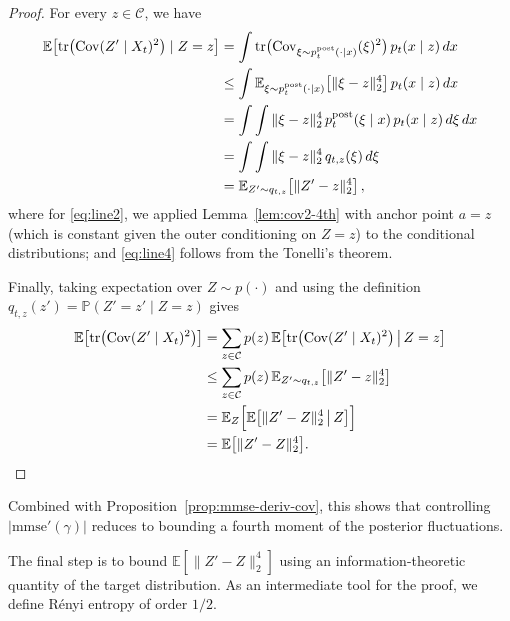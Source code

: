 \documentclass[11pt]{article}
\theoremstyle{definition}
\newcommand{\Cov}{\operatorname{Cov}}
\numberwithin{equation}{section}
\begin{document}
\begin{proof}

For every \(z \in \mathcal{C}\), we have
\begin{align}
\mathbb{E}\bigl[ \operatorname{tr}\bigl( \Cov(Z' \mid X_t)^2 \bigr) \mid Z = z \bigr]
&= \int \operatorname{tr}\bigl( \Cov_{\xi\sim p^{\mathrm{post}}_t(\cdot \mid x)}(\xi)^2 \bigr) \, p_t(x \mid z) \, dx \notag\\
&\le \int \mathbb{E}_{\xi\sim p^{\mathrm{post}}_t(\cdot \mid x)}\bigl[ \|\xi - z\|_2^4 \bigr] \,  p_t(x \mid z) \, dx \label{eq:line2}\\
&= \int \int \|\xi - z\|_2^4 \, p^{\mathrm{post}}_t(\xi \mid x)\, p_t(x \mid z) \, d\xi \, dx \notag\\
&= \int \int \|\xi - z\|_2^4 \, q_{t,z} (\xi) \, d\xi  \label{eq:line4}\\
&= \mathbb{E}_{Z' \sim q_{t,z}} \bigl[ \|Z' - z\|_2^4 \bigr]\notag\,,
\end{align}
where for \eqref{eq:line2}, we applied Lemma~\ref{lem:cov2-4th} with anchor point \(a = z\) (which is constant given the outer conditioning on \(Z = z\)) to the conditional distributions; and \eqref{eq:line4} follows from the Tonelli's theorem.

Finally, taking expectation over \(Z \sim p(\cdot)\) and using the definition $q_{t,z}(z')
= \mathbb{P}(Z'=z'\mid Z=z)$ gives
\begin{align*}
\mathbb{E}\bigl[ \operatorname{tr}\bigl( \Cov(Z' \mid X_t)^2 \bigr) \bigr]
&= \sum_{z\in\mathcal C} p(z)\, \mathbb{E}\bigl[ \operatorname{tr}\bigl( \Cov(Z' \mid X_t)^2 \bigr) \,\big|\, Z=z \bigr]\\
&\le \sum_{z\in\mathcal C} p(z)\, \mathbb{E}_{Z' \sim q_{t,z}} \bigl[ \|Z' - z\|_2^4 \bigr]\\
&= \mathbb{E}_{Z} \Bigl[ \mathbb{E}\bigl[ \|Z' - Z\|_2^4 \,\big|\, Z \bigr] \Bigr] \\
&= \mathbb{E}\bigl[ \|Z' - Z\|_2^4 \bigr].
\end{align*}
\end{proof}



Combined with Proposition~\ref{prop:mmse-deriv-cov}, this shows that controlling $|\mathrm{mmse}'(\gamma)|$ reduces to bounding a fourth moment of the posterior fluctuations.

The final step is to bound $\mathbb E[\|Z'-Z\|_2^4]$ using an information-theoretic quantity of the target distribution. As an intermediate tool for the proof, we define R\'enyi entropy of order $1/2$.
\end{document}
